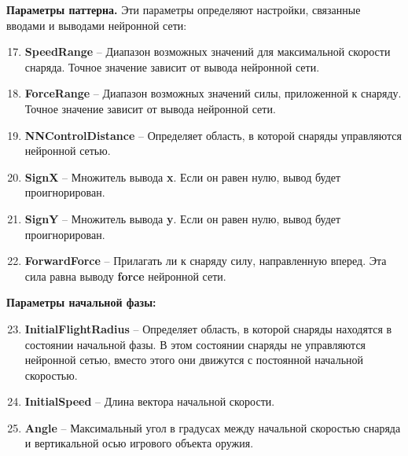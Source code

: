 \vspace{5mm}

\textbf{Параметры паттерна.} Эти параметры определяют настройки, связанные вводами и выводами нейронной сети:
\begin{enumerate}
    \setcounter{enumi}{16}
    \item {\small \textbf{SpeedRange}} -- Диапазон возможных значений для максимальной скорости снаряда. Точное значение зависит от вывода нейронной сети.
    \item {\small \textbf{ForceRange}} -- Диапазон возможных значений силы, приложенной к снаряду. Точное значение зависит от вывода нейронной сети.
    \item {\small \textbf{NNControlDistance}} -- Определяет область, в которой снаряды управляются нейронной сетью.
    \item {\small \textbf{SignX}} -- Множитель вывода \textbf{x}. Если он равен нулю, вывод будет проигнорирован.
    \item {\small \textbf{SignY}} -- Множитель вывода \textbf{y}. Если он равен нулю, вывод будет проигнорирован.
    \item {\small \textbf{ForwardForce}} -- Прилагать ли к снаряду силу, направленную вперед. Эта сила равна выводу {\small \textbf{force}} нейронной сети.
\end{enumerate}

\vspace{5mm}

\textbf{Параметры начальной фазы:}
\begin{enumerate}
    \setcounter{enumi}{22}
    \item {\small \textbf{InitialFlightRadius}} -- Определяет область, в которой снаряды находятся в состоянии начальной фазы. В этом состоянии снаряды не управляются нейронной сетью, вместо этого они движутся с постоянной начальной скоростью.
    \item {\small \textbf{InitialSpeed}} -- Длина вектора начальной скорости.
    \item {\small \textbf{Angle}} -- Максимальный угол в градусах между начальной скоростью снаряда и вертикальной осью игрового объекта оружия.
\end{enumerate}

\vspace{5mm}

